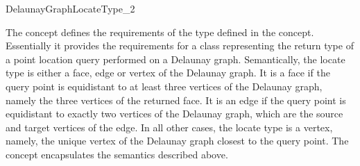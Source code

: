 


\begin{ccRefConcept}{DelaunayGraphLocateType_2}

\ccDefinition

The concept  defines the requirements of the
 type defined in the 
concept. Essentially it provides the requirements for a class
representing the return type of a point location query performed on a
Delaunay graph. Semantically, the locate type is either a face, edge or
vertex of the Delaunay graph. It is a face if the query point is
equidistant to at least three vertices of the Delaunay graph, namely
the three vertices of the returned face. It is an edge if the query
point is equidistant to exactly two vertices of the Delaunay graph,
which are the source and target vertices of the edge. In all other
cases, the locate type is a vertex, namely, the unique vertex of the
Delaunay graph closest to the query point. The
 concept encapsulates the semantics
described above.

\ccRefines
{}\\
\\

\ccTypes
{}
\ccThreeToTwo
%
\ccGlue
{}
\ccGlue
{}
\ccGlue
{}


\end{ccRefConcept}
